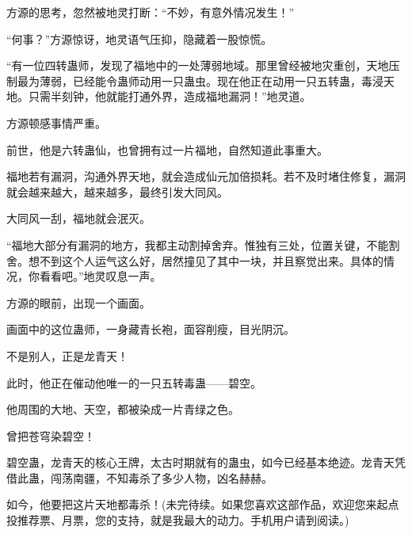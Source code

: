 \begin{this_body}
方源的思考，忽然被地灵打断：“不妙，有意外情况发生！”

“何事？”方源惊讶，地灵语气压抑，隐藏着一股惊慌。

“有一位四转蛊师，发现了福地中的一处薄弱地域。那里曾经被地灾重创，天地压制最为薄弱，已经能令蛊师动用一只蛊虫。现在他正在动用一只五转蛊，毒浸天地。只需半刻钟，他就能打通外界，造成福地漏洞！”地灵道。

方源顿感事情严重。

前世，他是六转蛊仙，也曾拥有过一片福地，自然知道此事重大。

福地若有漏洞，沟通外界天地，就会造成仙元加倍损耗。若不及时堵住修复，漏洞就会越来越大，越来越多，最终引发大同风。

大同风一刮，福地就会泯灭。

“福地大部分有漏洞的地方，我都主动割掉舍弃。惟独有三处，位置关键，不能割舍。想不到这个人运气这么好，居然撞见了其中一块，并且察觉出来。具体的情况，你看看吧。”地灵叹息一声。

方源的眼前，出现一个画面。

画面中的这位蛊师，一身藏青长袍，面容削瘦，目光阴沉。

不是别人，正是龙青天！

此时，他正在催动他唯一的一只五转毒蛊——碧空。

他周围的大地、天空，都被染成一片青绿之色。

曾把苍穹染碧空！

碧空蛊，龙青天的核心王牌，太古时期就有的蛊虫，如今已经基本绝迹。龙青天凭借此蛊，闯荡南疆，不知毒杀了多少人物，凶名赫赫。

如今，他要把这片天地都毒杀！(未完待续。如果您喜欢这部作品，欢迎您来起点投推荐票、月票，您的支持，就是我最大的动力。手机用户请到阅读。)

\end{this_body}

